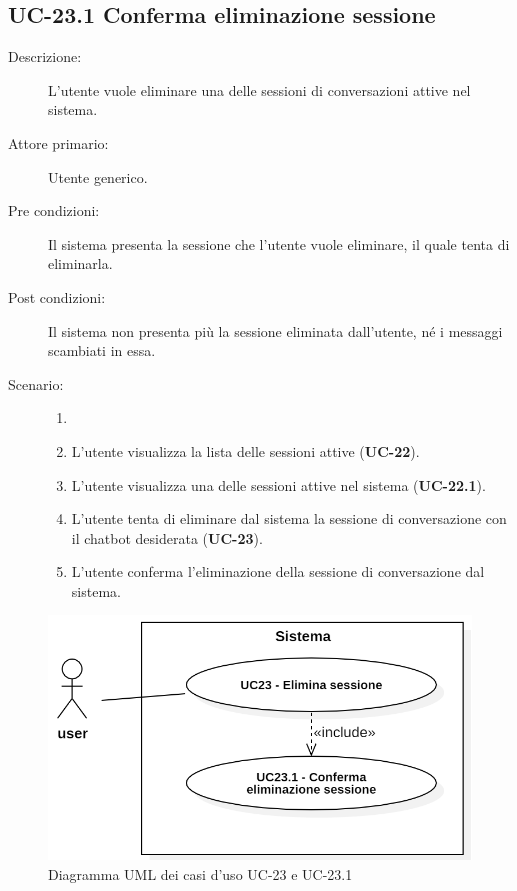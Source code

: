 \subsection{UC-23.1 Conferma eliminazione sessione}
\begin{description}
    \item[Descrizione:] L'utente vuole eliminare una delle sessioni di conversazioni attive nel sistema.
    \item[Attore primario:] Utente generico.
    \item[Pre condizioni:] Il sistema presenta la sessione che l'utente vuole eliminare, il quale tenta di eliminarla.
    \item[Post condizioni:] Il sistema non presenta più la sessione eliminata dall'utente, né i messaggi scambiati in essa.
    \item[Scenario:] 
    \begin{enumerate}
        \item[]
        \item L'utente visualizza la lista delle sessioni attive (\textbf{UC-22}).
        \item L'utente visualizza una delle sessioni attive nel sistema (\textbf{UC-22.1}).
        \item L'utente tenta di eliminare dal sistema la sessione di conversazione con il chatbot desiderata (\textbf{UC-23}).
        \item L'utente conferma l'eliminazione della sessione di conversazione dal sistema.
    \end{enumerate}
\end{description}

\begin{figure}[H]
    \centering
    \includegraphics[width=0.9\linewidth]{UC23.PNG} 
    \caption{Diagramma UML dei casi d'uso UC-23 e UC-23.1}
\end{figure}

